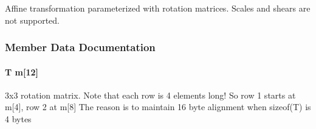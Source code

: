 Affine transformation parameterized with rotation matrices. Scales and shears are not supported. 

\subsubsection{Member Data Documentation}
\hypertarget{classOpenRAVE_1_1geometry_1_1RaveTransformMatrix_acb4433f3f4564fe3bda155f5ca6d241b}{
\paragraph[{m}]{\setlength{\rightskip}{0pt plus 5cm}T {\bf m}\mbox{[}12\mbox{]}}\hfill}
\label{classOpenRAVE_1_1geometry_1_1RaveTransformMatrix_acb4433f3f4564fe3bda155f5ca6d241b}
3x3 rotation matrix. Note that each row is 4 elements long! So row 1 starts at m\mbox{[}4\mbox{]}, row 2 at m\mbox{[}8\mbox{]} The reason is to maintain 16 byte alignment when sizeof(T) is 4 bytes 